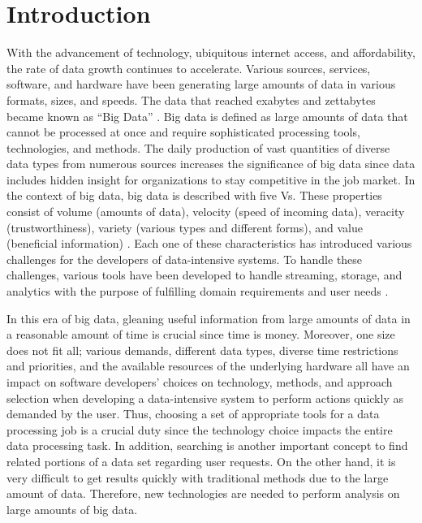 \documentclass[sn-mathphys]{sn-jnl}%
\theoremstyle{thmstyleone}%
\theoremstyle{thmstyletwo}%
\theoremstyle{thmstylethree}%
\begin{document}
\section{Introduction}\label{sec1}

With the advancement of technology, ubiquitous internet access, and affordability,  the rate of data growth continues to accelerate. Various sources, services, software, and hardware have been generating large amounts of data in various formats, sizes, and speeds. The data that reached exabytes and zettabytes became known as “Big Data” \cite{1}. Big data is defined as large amounts of data that cannot be processed at once and require sophisticated processing tools, technologies, and methods. The daily production of vast quantities of diverse data types from numerous sources \cite{22} increases the significance of big data since data includes hidden insight for organizations to stay competitive in the job market. In the context of big data, big data is described with five Vs. These properties consist of volume (amounts of data), velocity (speed of incoming data), veracity (trustworthiness), variety (various types and different forms), and value (beneficial information) \cite{21}. Each one of these characteristics has introduced various challenges for the developers of data-intensive systems. To handle these challenges, various tools have been developed to handle streaming, storage, and analytics with the purpose of fulfilling domain requirements and user needs \cite{23}. 


In this era of big data, gleaning useful information from large amounts of data in a reasonable amount of time is crucial since time is money. Moreover, one size does not fit all; various demands, different data types, diverse time restrictions and priorities, and the available resources of the underlying hardware all have an impact on software developers’ choices on technology, methods, and approach selection when developing a data-intensive system to perform actions quickly as demanded by the user. Thus, choosing a set of appropriate tools for a data processing job is a crucial duty since the technology choice impacts the entire data processing task. In addition, searching is another important concept to find related portions of a data set regarding user requests. On the other hand, it is very difficult to get results quickly with traditional methods due to the large amount of data. Therefore, new technologies are needed to perform analysis on large amounts of big data.
\end{document}
